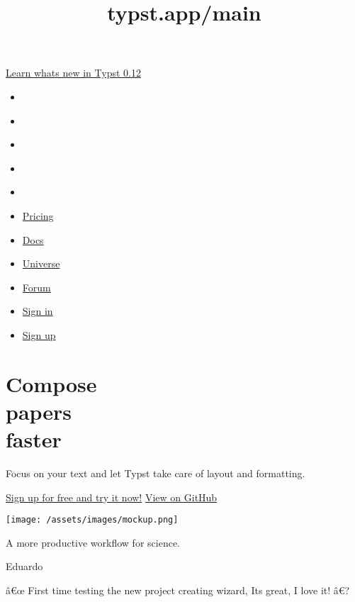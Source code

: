 \title{typst.app/main}

\href{https://typst.app/blog/2024/typst-0.12/}{Learn
what\textquotesingle s new in Typst 0.12}

\href{/\#start}{}

\begin{itemize}
\tightlist
\item
  \href{https://github.com/typst/}{}
\item
  \href{https://discord.gg/2uDybryKPe}{}
\item
  \href{https://mastodon.social/@typst}{}
\item
  \href{https://bsky.app/profile/typst.app}{}
\item
  \href{https://www.linkedin.com/company/typst/}{}
\item
  \href{/pricing/}{Pricing}
\item
  \href{/docs/}{Docs}
\item
  \href{/universe/}{Universe}
\item
  \href{https://forum.typst.app}{Forum}
\item
  \href{/signin/}{Sign in}
\item
  \label{header-btn}\href{/signup}{Sign up}
\end{itemize}

\label{start}
\section[Compose\\
\strut \\
faster]{\texorpdfstring{Compose\\
\protect\hypertarget{change}{}{ { papers } }\\
faster}{Compose   papers   faster}}\label{compose-papers-faster}

Focus on your text and let Typst take care of layout and formatting.

\href{/signup}{Sign up for free and try it now!}
\href{https://github.com/typst/typst}{View on GitHub}

\texttt{[image: /assets/images/mockup.png]}

\label{social-proof}
A more productive workflow for science.

Eduardo

â€œ First time testing the new project creating wizard,
It\textquotesingle s great, I love it! â€?


